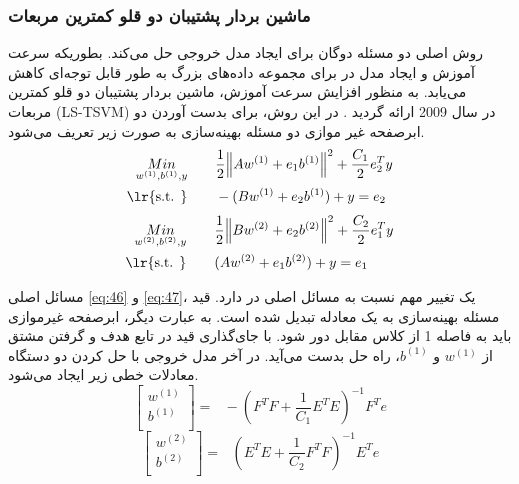 \subsubsection{ماشین بردار پشتیبان دو قلو کمترین مربعات}\label{sec:2:2:3:1}
روش  اصلی دو مسئله دوگان برای ایجاد مدل خروجی حل می‌کند. بطوریکه سرعت آموزش و ایجاد مدل در  برای مجموعه داده‌های بزرگ به طور قابل توجه‌ای کاهش می‌یابد. به منظور افزایش سرعت آموزش، ماشین بردار پشتیبان دو قلو کمترین مربعات (\gls{LS-TSVM})  در سال 2009 ارائه گردید \cite{kumar2009}. در این روش، برای بدست آوردن دو ابرصفحه غیر موازی دو مسئله بهینه‌سازی به صورت زیر تعریف می‌شود.
\begin{equation}
\begin{split}
 \underset{{{w}^{(1)}},{{b}^{(1)}},y}{\mathop{Min}} \qquad &\frac{1}{2}{{\left\| A{{w}^{(1)}}+{{e}_{1}}{{b}^{(1)}} \right\|}^{2}}+\frac{{{C}_{1}}}{2}e_{2}^{T}y \\ 
\textrm{\lr{s.t. }} \qquad & -(B{{w}^{(1)}}+{{e}_{2}}{{b}^{(1)}})+y={{e}_{2}}
\end{split}
\label{eq:46}
\end{equation}
\begin{equation}
\begin{split}
\underset{{{w}^{(2)}},{{b}^{(2)}},y}{\mathop{Min}} \qquad & \frac{1}{2}{{\left\| B{{w}^{(2)}}+{{e}_{2}}{{b}^{(2)}} \right\|}^{2}}+\frac{{{C}_{2}}}{2}e_{1}^{T}y \\ 
\textrm{\lr{s.t. }} \qquad & (A{{w}^{(2)}}+{{e}_{1}}{{b}^{(2)}})+y={{e}_{1}}
\end{split}
\label{eq:47}
\end{equation}

مسائل اصلی \ref{eq:46} و \ref{eq:47}، یک تغییر مهم نسبت به مسائل اصلی در  دارد. قید مسئله بهینه‌سازی به یک معادله تبدیل شده است. به عبارت دیگر، ابرصفحه غیرموازی باید به فاصله 1 از کلاس مقابل دور شود. با جای‌گذاری قید در تابع هدف و گرفتن مشتق از ${{w}^{(1)}}$ و ${{b}^{(1)}}$، راه حل بدست می‌آید. در آخر مدل خروجی با حل کردن دو دستگاه معادلات خطی زیر ایجاد می‌شود.
\begin{equation}
\left[ \begin{matrix}
{{w}^{(1)}} \\
{{b}^{(1)}} \\
\end{matrix}\right]=\text{ }-{{({{F}^{T}}F+\frac{1}{{{C}_{1}}}{{E}^{T}}E)}^{-1}}{{F}^{T}}e
\label{eq:48}
\end{equation}
\begin{equation}
\left[ \begin{matrix}
{{w}^{(2)}} \\
{{b}^{(2)}} \\
\end{matrix}\right]=\text{ }{{({{E}^{T}}E+\frac{1}{{{C}_{2}}}{{F}^{T}}F)}^{-1}}{{E}^{T}}e
\label{eq:49}
\end{equation}


